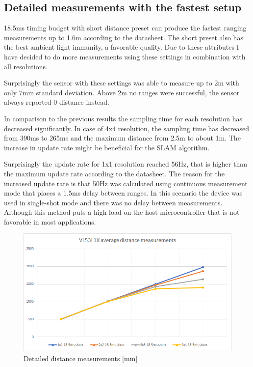 \subsection{Detailed measurements with the fastest setup}
18.5ms timing budget with short distance preset can produce the fastest ranging measurements 
up to 1.6m according to the datasheet. The short preset also has the best ambient light 
immunity, a favorable quality. Due to these attributes I have decided to do more measurements
using these settings in combination with all resolutions.

Surprisingly the sensor with these settings was able to measure up to 2m with only 7mm 
standard deviation. Above 2m no ranges were successful, the sensor always reported 0 distance 
instead.

In comparison to the previous results the sampling time for each resolution has decreased 
significantly. In case of 4x4 resolution, the sampling time has decreased from 390ms to
265ms and the maximum distance from 2.5m to about 1m. The increase in update rate might be 
beneficial for the SLAM algorithm.

Surprisingly the update rate for 1x1 resolution reached 56Hz, that is higher than the 
maximum update rate according to the datasheet. The reason for the increased update rate
is that 50Hz was calculated using continuous measurement mode that places a 1.5ms delay
between ranges. In this scenario the device was used in single-shot mode and there was 
no delay between measurements. Although this method puts a high load on the host 
microcontroller that is not favorable in most applications.



\begin{figure}[!h]
    \centering
	\includegraphics[width=115mm, keepaspectratio]{figures/vl53l1x_measurements_03_dist.png}
    \caption{Detailed distance measurements [mm]}
    \label{fig:vl53l1x_meas_further_detailed_dist}
\end{figure}

